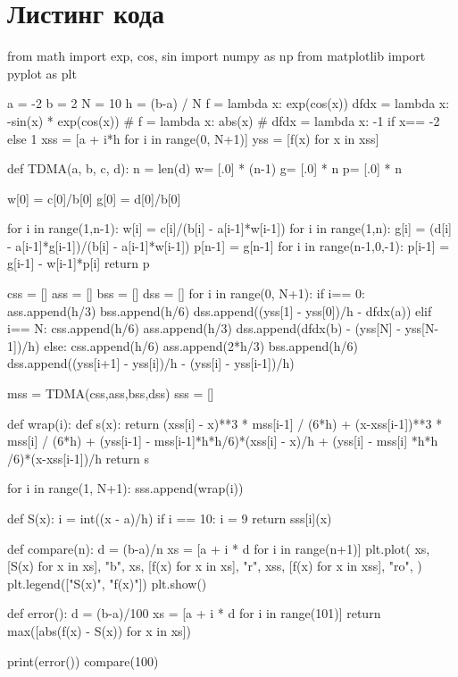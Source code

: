 \documentclass{article}
\begin{document}
\section*{Листинг кода}
\begin{python}
from math import exp, cos, sin
import numpy as np
from matplotlib import pyplot as plt

a = -2
b = 2
N = 10
h = (b-a) / N
f = lambda x: exp(cos(x))
dfdx = lambda x: -sin(x) * exp(cos(x))
# f = lambda x: abs(x)
# dfdx = lambda x: -1 if x== -2 else 1
xss = [a + i*h for i in range(0, N+1)]
yss = [f(x) for x in xss]

def TDMA(a, b, c, d):
    n = len(d)
    w=  [.0] * (n-1)
    g= [.0] * n
    p= [.0] * n
    
    w[0] = c[0]/b[0]
    g[0] = d[0]/b[0]

    for i in range(1,n-1):
        w[i] = c[i]/(b[i] - a[i-1]*w[i-1])
    for i in range(1,n):
        g[i] = (d[i] - a[i-1]*g[i-1])/(b[i] - a[i-1]*w[i-1])
    p[n-1] = g[n-1]
    for i in range(n-1,0,-1):
        p[i-1] = g[i-1] - w[i-1]*p[i]
    return p

css = []
ass = []
bss = []
dss = []
for i in range(0, N+1):
    if i== 0:
        ass.append(h/3)
        bss.append(h/6)
        dss.append((yss[1] - yss[0])/h - dfdx(a))
    elif i== N:
        css.append(h/6)
        ass.append(h/3)
        dss.append(dfdx(b) - (yss[N] - yss[N-1])/h)
    else:
        css.append(h/6)
        ass.append(2*h/3)
        bss.append(h/6)
        dss.append((yss[i+1] - yss[i])/h - (yss[i] - yss[i-1])/h)

mss = TDMA(css,ass,bss,dss)
sss = []

def wrap(i):
    def s(x): 
        return (xss[i] - x)**3 * mss[i-1] / (6*h)  + (x-xss[i-1])**3 * mss[i] / (6*h) + (yss[i-1] - mss[i-1]*h*h/6)*(xss[i] - x)/h + (yss[i] - mss[i] *h*h /6)*(x-xss[i-1])/h
    return s

for i in range(1, N+1):
    sss.append(wrap(i))

def S(x):
    i  = int((x - a)/h)
    if i == 10:
        i = 9
    return sss[i](x)

def compare(n):
    d = (b-a)/n
    xs = [a + i * d for i in range(n+1)]
    plt.plot(
            xs, [S(x) for x in xs], "b",
            xs, [f(x) for x in xs],  "r",
            xss, [f(x) for x in xss], "ro",
    )
    plt.legend(["S(x)", "f(x)"])
    plt.show()

def error():
    d = (b-a)/100
    xs = [a + i * d for i in range(101)]
    return max([abs(f(x) - S(x)) for x in xs])

print(error())
compare(100)
\end{python}
\end{document}
